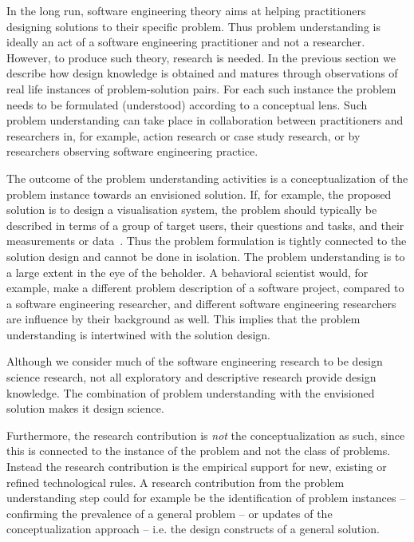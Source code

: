 \documentclass[graybox]{svmult}
\begin{document}
In the long run, software engineering theory aims at helping practitioners designing solutions to their specific problem. Thus problem understanding is ideally an act of a software engineering practitioner and not a researcher. However, to produce such theory, research is needed. In the previous section we describe how design knowledge is obtained and matures through observations of real life instances of problem-solution pairs. For each such instance the problem needs to be formulated (understood) according to a conceptual lens. Such problem understanding can take place in collaboration between practitioners and researchers in, for example, action research or case study research, or by researchers observing software engineering practice.


The outcome of the problem understanding activities is a conceptualization of the problem instance towards an envisioned solution. If, for example, the proposed solution is to design a visualisation system, the problem should typically be described in terms of a group of target users, their questions and tasks, and their measurements or data~\cite{meyer_nested_2015}. Thus the problem formulation is tightly connected to the solution design and cannot be done in isolation. The problem understanding is to a large extent in the eye of the beholder. A behavioral scientist would, for example,  make a different problem description of a software project, compared to a software engineering researcher, and different software engineering researchers are influence by their background as well. This implies that the problem understanding is intertwined with the solution design.

Although we consider much of the software engineering research to be design science research, not all exploratory and descriptive research provide design knowledge. The combination of problem understanding with the envisioned solution makes it design science.


Furthermore, the research contribution is \emph{not} the conceptualization as such, since this is connected to the instance of the problem and not the class of problems. Instead the research contribution is the empirical support for new, existing or refined technological rules. A research contribution from the problem understanding step could for example be the identification of problem instances -- confirming the prevalence of a general problem -- or updates of the conceptualization approach -- i.e. the design constructs of a general solution.
\end{document}
